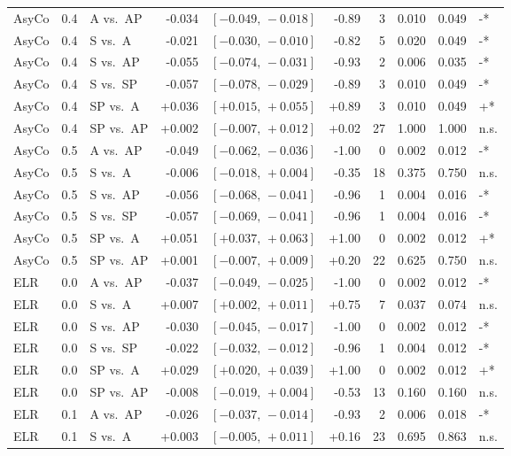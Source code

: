 \begin{landscape}
\begin{scriptsize}
\begin{longtable}{lllrrrrrrl}
AsyCo & 0.4 & A vs.\ AP & -0.034 & $[-0.049,\,-0.018]$ & -0.89 & 3 & 0.010 & 0.049 & -* \\
AsyCo & 0.4 & S vs.\ A & -0.021 & $[-0.030,\,-0.010]$ & -0.82 & 5 & 0.020 & 0.049 & -* \\
AsyCo & 0.4 & S vs.\ AP & -0.055 & $[-0.074,\,-0.031]$ & -0.93 & 2 & 0.006 & 0.035 & -* \\
AsyCo & 0.4 & S vs.\ SP & -0.057 & $[-0.078,\,-0.029]$ & -0.89 & 3 & 0.010 & 0.049 & -* \\
AsyCo & 0.4 & SP vs.\ A & +0.036 & $[+0.015,\,+0.055]$ & +0.89 & 3 & 0.010 & 0.049 & +* \\
AsyCo & 0.4 & SP vs.\ AP & +0.002 & $[-0.007,\,+0.012]$ & +0.02 & 27 & 1.000 & 1.000 & n.s. \\
AsyCo & 0.5 & A vs.\ AP & -0.049 & $[-0.062,\,-0.036]$ & -1.00 & 0 & 0.002 & 0.012 & -* \\
AsyCo & 0.5 & S vs.\ A & -0.006 & $[-0.018,\,+0.004]$ & -0.35 & 18 & 0.375 & 0.750 & n.s. \\
AsyCo & 0.5 & S vs.\ AP & -0.056 & $[-0.068,\,-0.041]$ & -0.96 & 1 & 0.004 & 0.016 & -* \\
AsyCo & 0.5 & S vs.\ SP & -0.057 & $[-0.069,\,-0.041]$ & -0.96 & 1 & 0.004 & 0.016 & -* \\
AsyCo & 0.5 & SP vs.\ A & +0.051 & $[+0.037,\,+0.063]$ & +1.00 & 0 & 0.002 & 0.012 & +* \\
AsyCo & 0.5 & SP vs.\ AP & +0.001 & $[-0.007,\,+0.009]$ & +0.20 & 22 & 0.625 & 0.750 & n.s. \\
ELR & 0.0 & A vs.\ AP & -0.037 & $[-0.049,\,-0.025]$ & -1.00 & 0 & 0.002 & 0.012 & -* \\
ELR & 0.0 & S vs.\ A & +0.007 & $[+0.002,\,+0.011]$ & +0.75 & 7 & 0.037 & 0.074 & n.s. \\
ELR & 0.0 & S vs.\ AP & -0.030 & $[-0.045,\,-0.017]$ & -1.00 & 0 & 0.002 & 0.012 & -* \\
ELR & 0.0 & S vs.\ SP & -0.022 & $[-0.032,\,-0.012]$ & -0.96 & 1 & 0.004 & 0.012 & -* \\
ELR & 0.0 & SP vs.\ A & +0.029 & $[+0.020,\,+0.039]$ & +1.00 & 0 & 0.002 & 0.012 & +* \\
ELR & 0.0 & SP vs.\ AP & -0.008 & $[-0.019,\,+0.004]$ & -0.53 & 13 & 0.160 & 0.160 & n.s. \\
ELR & 0.1 & A vs.\ AP & -0.026 & $[-0.037,\,-0.014]$ & -0.93 & 2 & 0.006 & 0.018 & -* \\
ELR & 0.1 & S vs.\ A & +0.003 & $[-0.005,\,+0.011]$ & +0.16 & 23 & 0.695 & 0.863 & n.s. \\

\end{longtable}
\end{scriptsize}
\end{landscape}
